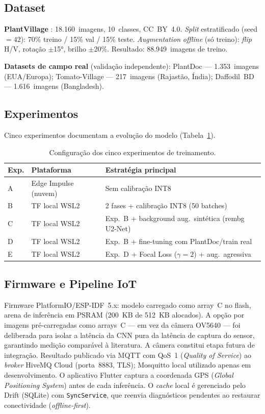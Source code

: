 \documentclass[12pt]{article}
\begin{document}
\subsection{Dataset}

\textbf{PlantVillage} \cite{hughes2015}: 18.160~imagens, 10~classes, CC~BY~4.0.
\textit{Split} estratificado (seed$=42$): 70\% treino / 15\% val / 15\% teste.
\textit{Augmentation} \textit{offline} (só treino): \textit{flip} H/V, rotação $\pm$15°, brilho $\pm$20\%.
Resultado: 88.949~imagens de treino.

\textbf{Datasets de campo real} (validação independente):
PlantDoc \cite{singh2020} --- 1.353~imagens (EUA/Europa);
Tomato-Village \cite{gehlot2023} --- 217~imagens (Rajastão, Índia);
Daffodil~BD~\cite{daffodilbd2024} --- 1.616~imagens (Bangladesh).

\subsection{Experimentos}

Cinco experimentos documentam a evolução do modelo (Tabela~\ref{tab:experimentos}).

\begin{table}[ht]
\centering
\caption{Configuração dos cinco experimentos de treinamento.}
\label{tab:experimentos}
\begin{tabular}{@{}llp{5.5cm}@{}}
\toprule
\textbf{Exp.} & \textbf{Plataforma} & \textbf{Estratégia principal} \\
\midrule
A & Edge Impulse (nuvem) & Sem calibração INT8 \\
B & TF local WSL2 & 2 fases + calibração INT8 (50 batches) \\
C & TF local WSL2 & Exp.~B + background aug.\ sintética (rembg U2-Net) \\
D & TF local WSL2 & Exp.~B + fine-tuning com PlantDoc/train real \\
E & TF local WSL2 & Exp.~D + Focal Loss ($\gamma=2$) + aug.\ agressiva \\
\bottomrule
\end{tabular}
\end{table}

\subsection{Firmware e Pipeline IoT}

Firmware PlatformIO/ESP-IDF~5.x: modelo carregado como array~C no flash, arena de
inferência em PSRAM (200~KB de 512~KB alocados). A opção por imagens pré-carregadas
como arrays~C --- em vez da câmera OV5640 --- foi deliberada para isolar a latência
da CNN pura da latência de captura do sensor, garantindo medição comparável à
literatura. A câmera constitui etapa futura de integração. Resultado publicado via
MQTT com QoS~1 (\textit{Quality of Service}) ao \textit{broker} HiveMQ Cloud
(porta~8883, TLS); Mosquitto local utilizado apenas em desenvolvimento. O aplicativo
Flutter captura a coordenada GPS (\textit{Global Positioning System}) antes de cada
inferência. O \textit{cache} local é gerenciado pelo Drift (SQLite) com
\texttt{SyncService}, que reenvia diagnósticos pendentes ao restaurar conectividade
(\textit{offline-first}).
\end{document}
